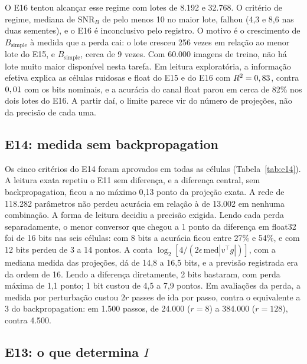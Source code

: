 \documentclass[journal]{IEEEtran}
\newcommand{\SNR}{\mathrm{SNR}}
\begin{document}
O E16 tentou alcançar esse regime com lotes de 8.192 e 32.768. O critério de regime, mediana de $\SNR_B$ de pelo menos 10 no maior lote, falhou (4,3 e 8,6 nas duas sementes), e o E16 é inconclusivo pelo registro. O motivo é o crescimento de $B_{\text{simple}}$ à medida que a perda cai: o lote cresceu 256 vezes em relação ao menor lote do E15, e $B_{\text{simple}}$, cerca de 9 vezes. Com 60.000 imagens de treino, não há lote muito maior disponível nesta tarefa. Em leitura exploratória, a informação efetiva explica as \EdezesseisCelulas{} células ruidosas e float do E15 e do E16 com $R^2 = 0,83$, contra $0,01$ com os bits nominais, e a acurácia do canal float parou em cerca de 82\% nos dois lotes do E16. A partir daí, o limite parece vir do número de projeções, não da precisão de cada uma.

\subsection{E14: medida sem backpropagation}

\EquatorzeTabela

Os cinco critérios do E14 foram aprovados em todas as células (Tabela~\ref{tab:e14}). A leitura exata repetiu o E11 sem diferença, e a diferença central, sem backpropagation, ficou a no máximo 0,13 ponto da projeção exata. A rede de 118.282 parâmetros não perdeu acurácia em relação à de 13.002 em nenhuma combinação. A forma de leitura decidiu a precisão exigida. Lendo cada perda separadamente, o menor conversor que chegou a 1 ponto da diferença em float32 foi de 16 bits nas seis células: com 8 bits a acurácia ficou entre 27\% e 54\%, e com 12 bits perdeu de 3 a 14 pontos. A conta $\log_2[4/(2\epsilon\,\mathrm{med}|v^\top g|)]$, com a mediana medida das projeções, dá de 14,8 a 16,5 bits, e a previsão registrada era da ordem de 16. Lendo a diferença diretamente, 2 bits bastaram, com perda máxima de 1,1 ponto; 1 bit custou de 4,5 a 7,9 pontos. Em avaliações da perda, a medida por perturbação custou $2r$ passes de ida por passo, contra o equivalente a 3 do backpropagation: em 1.500 passos, de 24.000 ($r = 8$) a 384.000 ($r = 128$), contra 4.500.

\subsection{E13: o que determina $I$}

\EtrezeTabela
\EtrezeFigura
\end{document}
